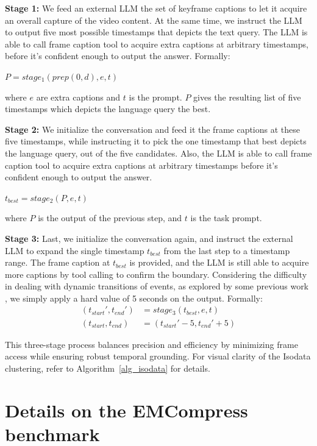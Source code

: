 \textbf{Stage 1:}  We feed an external LLM the set of keyframe captions to let it acquire an overall capture of the video content. At the same time, we instruct the LLM to output five most possible timestamps that depicts the text query. The LLM is able to call frame caption tool to acquire extra captions at arbitrary timestamps, before it's confident enough to output the answer. Formally:
\begin{center}
$P = stage_1(prep(0, d), e, t)$
\end{center}
where $e$ are extra captions and $t$ is the prompt. $P$ gives the resulting list of five timestamps which depicts the language query the best.

\textbf{Stage 2:} We initialize the conversation and feed it the frame captions at these five timestamps, while instructing it to pick the one timestamp that best depicts the language query, out of the five candidates. Also, the LLM is able to call frame caption tool to acquire extra captions at arbitrary timestamps before it's confident enough to output the answer. 
\begin{center}
$t_{best} = stage_2(P, e, t)$
\end{center}
where $P$ is the output of the previous step, and $t$ is the task prompt.

\textbf{Stage 3:} Last, we initialize the conversation again, and instruct the external LLM to expand the single timestamp $t_{best}$ from the last step to a timestamp range. The frame caption at $t_{best}$ is provided, and the LLM is still able to acquire more captions by tool calling to confirm the boundary. Considering the difficulty in dealing with dynamic transitions of events, as explored by some previous work \citep{tfvtg}, we simply apply a hard value of 5 seconds on the output. Formally:
\begin{align*}
(t_{start}', t_{end}') &= stage_3(t_{best}, e, t) \\
(t_{start}, t_{end}) &= (t_{start}' - 5, t_{end}' + 5)
\end{align*}

This three-stage process balances precision and efficiency by minimizing frame access while ensuring robust temporal grounding. For visual clarity of the Isodata clustering, refer to Algorithm~\ref{alg_isodata} for details.

\section{Details on the EMCompress benchmark}
\label{yc2emc_appendix}

